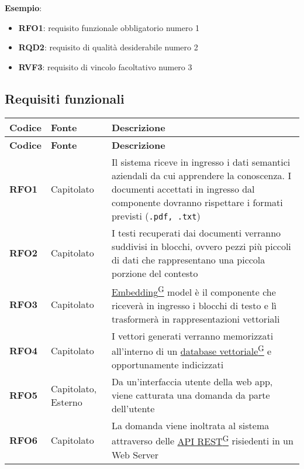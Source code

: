 \textbf{Esempio}:
\begin{itemize}
	\item \textbf{RFO1}: requisito funzionale obbligatorio numero 1
	\item \textbf{RQD2}: requisito di qualità desiderabile numero 2
	\item \textbf{RVF3}: requisito di vincolo facoltativo numero 3
\end{itemize}

\pagebreak
\subsection{Requisiti funzionali}
\begin{longtable}{|>{\centering\arraybackslash}m{}|>{\centering\arraybackslash}m{}|>{\arraybackslash}m{}|}
	\hline
	\textbf{Codice} & \textbf{Fonte} & \textbf{Descrizione}\\\hline
	\endfirsthead
	\hline
	\textbf{Codice} & \textbf{Fonte} & \textbf{Descrizione}\\\hline
	\endhead
	\hline
	\textbf{RFO1}            & Capitolato    & Il sistema riceve in ingresso i dati semantici aziendali da cui apprendere la conoscenza. I documenti accettati in ingresso dal componente dovranno rispettare i formati previsti (\texttt{.pdf, .txt}) \\
	\hline
	\textbf{RFO2} & Capitolato & I testi recuperati dai documenti verranno suddivisi in blocchi, ovvero pezzi più piccoli di dati che rappresentano una piccola porzione del contesto\\
	\hline
	\textbf{RFO3} & Capitolato & \href{https://code7crusaders.github.io/docs/RTB/documentazione_interna/glossario.html#embedding}{Embedding\textsuperscript{G}} model è il componente che riceverà in ingresso i blocchi di testo e lì trasformerà in rappresentazioni vettoriali\\
	\hline
	\textbf{RFO4} & Capitolato & I vettori generati verranno memorizzati all’interno di un \href{https://code7crusaders.github.io/docs/RTB/documentazione_interna/glossario.html#database-vettoriale}{database vettoriale\textsuperscript{G}} e opportunamente indicizzati\\
	\hline
	\textbf{RFO5} & Capitolato, Esterno & Da un’interfaccia utente della web app, viene catturata una domanda da parte dell’utente\\
	\hline
	\textbf{RFO6} & Capitolato & La domanda viene inoltrata al sistema attraverso delle \href{https://code7crusaders.github.io/docs/RTB/documentazione_interna/glossario.html#api-rest-representational-state-transfer}{API REST\textsuperscript{G}} risiedenti in un Web Server\\

\end{longtable}
